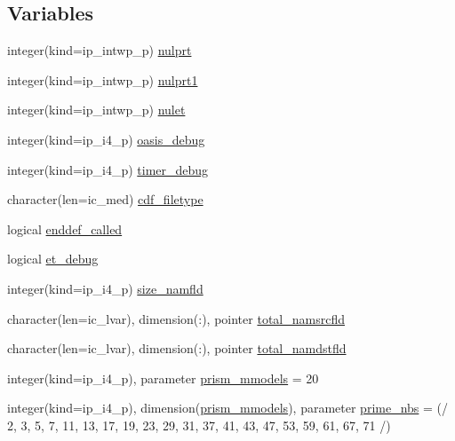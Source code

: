 \subsection*{Variables}
\begin{DoxyCompactItemize}
\item 
integer(kind=ip\+\_\+intwp\+\_\+p) \hyperlink{namespacemod__oasis__data_af0f17b70f48598dac24f2e41ca0da4b2}{nulprt}
\item 
integer(kind=ip\+\_\+intwp\+\_\+p) \hyperlink{namespacemod__oasis__data_a2b9f5c72f10178df0bda39000b151d24}{nulprt1}
\item 
integer(kind=ip\+\_\+intwp\+\_\+p) \hyperlink{namespacemod__oasis__data_a673f1cdeb400a5e3460a065310a492a1}{nulet}
\item 
integer(kind=ip\+\_\+i4\+\_\+p) \hyperlink{namespacemod__oasis__data_a51f2f4f66476cf893f2507722cd65958}{oasis\+\_\+debug}
\item 
integer(kind=ip\+\_\+i4\+\_\+p) \hyperlink{namespacemod__oasis__data_a320a34357de5c3049ccf102df7b97f5e}{timer\+\_\+debug}
\item 
character(len=ic\+\_\+med) \hyperlink{namespacemod__oasis__data_adf52e0e1baededb92201f7592811d00d}{cdf\+\_\+filetype}
\item 
logical \hyperlink{namespacemod__oasis__data_a5341a9152ef540667f7fcaa4f04c6399}{enddef\+\_\+called}
\item 
logical \hyperlink{namespacemod__oasis__data_aaffd695f4c3185d0ac798d0b63fe612c}{et\+\_\+debug}
\item 
integer(kind=ip\+\_\+i4\+\_\+p) \hyperlink{namespacemod__oasis__data_aa8588b3be582de7f61aa318d45854483}{size\+\_\+namfld}
\item 
character(len=ic\+\_\+lvar), dimension(\+:), pointer \hyperlink{namespacemod__oasis__data_a58b5a440f274f5dfb942d7e18f12674c}{total\+\_\+namsrcfld}
\item 
character(len=ic\+\_\+lvar), dimension(\+:), pointer \hyperlink{namespacemod__oasis__data_a81466361b20004007f221dd6a32041f9}{total\+\_\+namdstfld}
\item 
integer(kind=ip\+\_\+i4\+\_\+p), parameter \hyperlink{namespacemod__oasis__data_a11c61975c048981f7e508f1b6caf16b6}{prism\+\_\+mmodels} = 20
\item 
integer(kind=ip\+\_\+i4\+\_\+p), dimension(\hyperlink{namespacemod__oasis__data_a11c61975c048981f7e508f1b6caf16b6}{prism\+\_\+mmodels}), parameter \hyperlink{namespacemod__oasis__data_a56cd74c9147ef028573f2d5eb5e06fdc}{prime\+\_\+nbs} = (/ 2, 3, 5, 7, 11, 13, 17, 19, 23, 29, 31, 37, 41, 43, 47, 53, 59, 61, 67, 71 /)

\end{DoxyCompactItemize}
